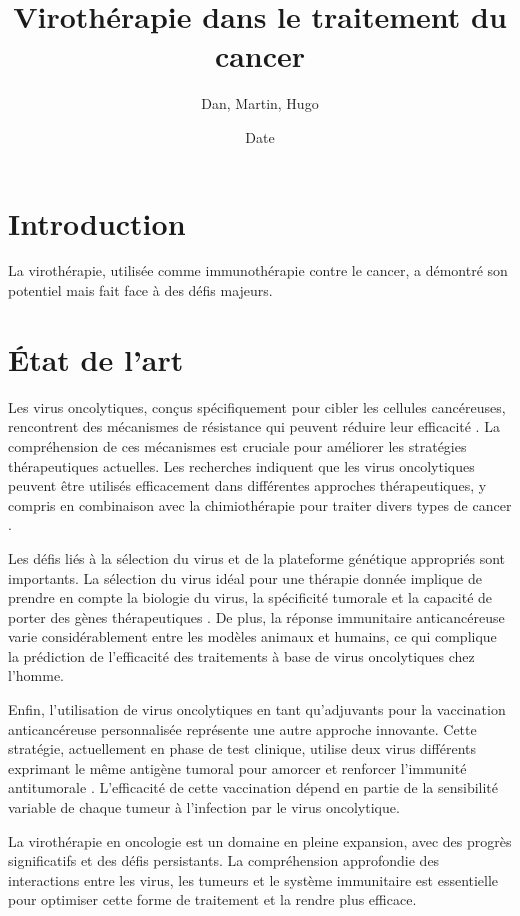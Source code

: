 \documentclass{article}
\title{Virothérapie dans le traitement du cancer}
\author{Dan, Martin, Hugo}
\date{Date}
\begin{document}
\maketitle

\section*{Introduction}

La virothérapie, utilisée comme immunothérapie contre le cancer, a démontré son potentiel mais fait face à des défis majeurs.

\section*{État de l'art}

Les virus oncolytiques, conçus spécifiquement pour cibler les cellules cancéreuses, rencontrent des mécanismes de résistance qui peuvent réduire leur efficacité \cite{goradel2022}. La compréhension de ces mécanismes est cruciale pour améliorer les stratégies thérapeutiques actuelles. Les recherches indiquent que les virus oncolytiques peuvent être utilisés efficacement dans différentes approches thérapeutiques, y compris en combinaison avec la chimiothérapie pour traiter divers types de cancer \cite{zeyaullah2012}.

Les défis liés à la sélection du virus et de la plateforme génétique appropriés sont importants. La sélection du virus idéal pour une thérapie donnée implique de prendre en compte la biologie du virus, la spécificité tumorale et la capacité de porter des gènes thérapeutiques \cite{mcfadden2021}. De plus, la réponse immunitaire anticancéreuse varie considérablement entre les modèles animaux et humains, ce qui complique la prédiction de l'efficacité des traitements à base de virus oncolytiques chez l'homme.

Enfin, l'utilisation de virus oncolytiques en tant qu'adjuvants pour la vaccination anticancéreuse personnalisée représente une autre approche innovante. Cette stratégie, actuellement en phase de test clinique, utilise deux virus différents exprimant le même antigène tumoral pour amorcer et renforcer l'immunité antitumorale \cite{roy2021}. L'efficacité de cette vaccination dépend en partie de la sensibilité variable de chaque tumeur à l'infection par le virus oncolytique.

La virothérapie en oncologie est un domaine en pleine expansion, avec des progrès significatifs et des défis persistants. La compréhension approfondie des interactions entre les virus, les tumeurs et le système immunitaire est essentielle pour optimiser cette forme de traitement et la rendre plus efficace.



\end{document}
